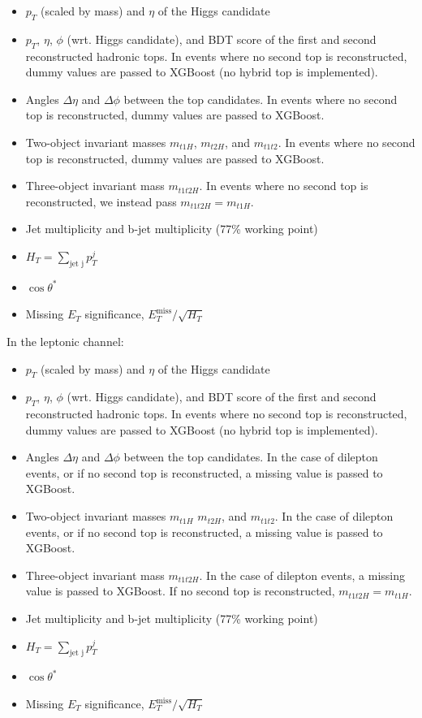 \begin{itemize}
\item $p_{T}$ (scaled by mass) and $\eta$ of the Higgs candidate
\item $p_{T}$, $\eta$, $\phi$ (wrt. Higgs candidate), and BDT score of the first and second reconstructed hadronic tops. In events where no second top is reconstructed, dummy values are passed to XGBoost (no hybrid top is implemented).
\item Angles $\Delta\eta$ and $\Delta\phi$ between the top candidates. In events where no second top is reconstructed, dummy values are passed to XGBoost.
\item Two-object invariant masses $m_{t1H}$, $m_{t2H}$, and $m_{t1t2}$. In events where no second top is reconstructed, dummy values are passed to XGBoost.
\item Three-object invariant mass $m_{t1t2H}$. In events where no second top is reconstructed, we instead pass $m_{t1t2H} = m_{t1H}$.
\item Jet multiplicity and b-jet multiplicity (77\% working point)
\item $H_{T} = \sum_\text{jet j} p^{j}_{T}$
\item $\cos\theta^{*}$
\item Missing $E_{T}$ significance, $E_{T}^\text{miss}/\sqrt{H_{T}}$
\end{itemize}

In the leptonic channel: 

\begin{itemize} 
\item $p_{T}$ (scaled by mass) and $\eta$ of the Higgs candidate
\item $p_{T}$, $\eta$, $\phi$ (wrt. Higgs candidate), and BDT score of the first and second reconstructed hadronic tops. In events where no second top is reconstructed, dummy values are passed to XGBoost (no hybrid top is implemented).
\item Angles $\Delta\eta$ and $\Delta\phi$ between the top candidates. In the case of dilepton events, or if no second top is reconstructed, a missing value is passed to XGBoost.
\item Two-object invariant masses $m_{t1H}$ $m_{t2H}$, and $m_{t1t2}$. In the case of dilepton events, or if no second top is reconstructed, a missing value is passed to XGBoost.
\item Three-object invariant mass $m_{t1t2H}$. In the case of dilepton events, a missing value is passed to XGBoost. If no second top is reconstructed, $m_{t1t2H} = m_{t1H}$.
\item Jet multiplicity and b-jet multiplicity (77\% working point)
\item $H_{T} = \sum_\text{jet j} p^{j}_{T}$
\item $\cos\theta^{*}$
\item Missing $E_{T}$ significance, $E_{T}^\text{miss}/\sqrt{H_{T}}$
\end{itemize} 

